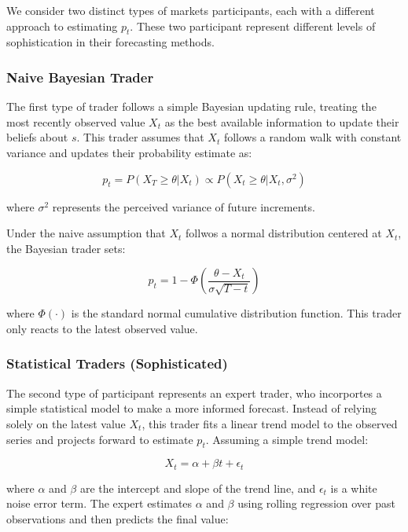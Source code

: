We consider two distinct types of markets participants,
each with a different approach to estimating $p_t$. 
These two participant represent different levels of 
sophistication in their forecasting methods.

\subsubsection{Naive Bayesian Trader}

The first type of trader follows a simple 
Bayesian updating rule, treating the most recently observed 
value $X_t$ as the best available information to 
update their beliefs about $s$. This trader assumes 
that $X_t$ follows a random walk with constant variance and updates 
their probability estimate as:

\begin{equation}
    p_t = P(X_T \geq \theta | X_t) \propto P(X_t \geq \theta | X_t, \sigma^2)
\end{equation}

where $\sigma^2$ represents the perceived variance of future increments.

Under the naive assumption that $X_t$ follwos a normal distribution 
centered at $X_t$, the Bayesian trader sets:

\begin{equation}
    p_t = 1 - \Phi \left( \frac{\theta - X_t}{\sigma \sqrt{T - t}} \right)
\end{equation}

where $\Phi(\cdot)$ is the standard normal cumulative distribution function.
This trader only reacts to the latest observed value.

\subsubsection{Statistical Traders (Sophisticated)}

The second type of participant represents an expert trader, 
who incorportes a simple statistical model to 
make a more informed forecast. Instead of relying solely on the latest 
value $X_t$, this trader fits a linear trend model 
to the observed series and projects forward to estimate $p_t$. 
Assuming a simple trend model:

\begin{equation}
    X_t = \alpha + \beta t + \epsilon_t
\end{equation}

where $\alpha$ and $\beta$ are the intercept and slope of the trend line,
and $\epsilon_t$ is a white noise error term.
The expert estimates $\alpha$ and $\beta$ using rolling regression 
over past observations and then predicts the final value:

